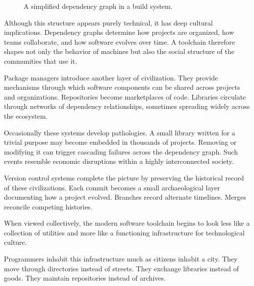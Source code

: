 \documentclass[11pt]{article}
\theoremstyle{definition}
\begin{document}
\begin{figure}[h]
\centering
{}
\caption{A simplified dependency graph in a build system.}
\end{figure}

Although this structure appears purely technical, it has deep cultural
implications. Dependency graphs determine how projects are organized,
how teams collaborate, and how software evolves over time. A toolchain
therefore shapes not only the behavior of machines but also the social
structure of the communities that use it.

Package managers introduce another layer of civilization. They provide
mechanisms through which software components can be shared across
projects and organizations. Repositories become marketplaces of code.
Libraries circulate through networks of dependency relationships,
sometimes spreading widely across the ecosystem.

Occasionally these systems develop pathologies. A small library written
for a trivial purpose may become embedded in thousands of projects.
Removing or modifying it can trigger cascading failures across the
dependency graph. Such events resemble economic disruptions within a
highly interconnected society.

Version control systems complete the picture by preserving the
historical record of these civilizations. Each commit becomes a small
archaeological layer documenting how a project evolved. Branches
record alternate timelines. Merges reconcile competing histories.

When viewed collectively, the modern software toolchain begins to look
less like a collection of utilities and more like a functioning
infrastructure for technological culture.

Programmers inhabit this infrastructure much as citizens inhabit a
city. They move through directories instead of streets. They exchange
libraries instead of goods. They maintain repositories instead of
archives.
\end{document}
